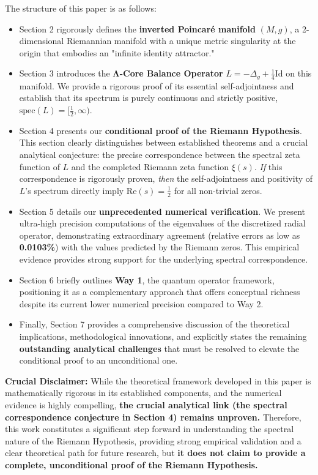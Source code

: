 \documentclass[12pt]{article}
\begin{document}
The structure of this paper is as follows:
\begin{itemize}
    \item Section 2 rigorously defines the \textbf{inverted Poincaré manifold} $(M,g)$, a 2-dimensional Riemannian manifold with a unique metric singularity at the origin that embodies an "infinite identity attractor."
    \item Section 3 introduces the \textbf{Λ-Core Balance Operator} $L = -\Delta_g + \frac{1}{4}\text{Id}$ on this manifold. We provide a rigorous proof of its essential self-adjointness and establish that its spectrum is purely continuous and strictly positive, $\text{spec}(L) = [\frac{1}{2}, \infty)$.
    \item Section 4 presents our \textbf{conditional proof of the Riemann Hypothesis}. This section clearly distinguishes between established theorems and a crucial analytical conjecture: the precise correspondence between the spectral zeta function of $L$ and the completed Riemann zeta function $\xi(s)$. \textit{If} this correspondence is rigorously proven, \textit{then} the self-adjointness and positivity of $L$'s spectrum directly imply $\text{Re}(s) = \frac{1}{2}$ for all non-trivial zeros.
    \item Section 5 details our \textbf{unprecedented numerical verification}. We present ultra-high precision computations of the eigenvalues of the discretized radial operator, demonstrating extraordinary agreement (relative errors as low as \textbf{0.0103\%}) with the values predicted by the Riemann zeros. This empirical evidence provides strong support for the underlying spectral correspondence.
    \item Section 6 briefly outlines \textbf{Way 1}, the quantum operator framework, positioning it as a complementary approach that offers conceptual richness despite its current lower numerical precision compared to Way 2.
    \item Finally, Section 7 provides a comprehensive discussion of the theoretical implications, methodological innovations, and explicitly states the remaining \textbf{outstanding analytical challenges} that must be resolved to elevate the conditional proof to an unconditional one.
\end{itemize}

\textbf{Crucial Disclaimer:} While the theoretical framework developed in this paper is mathematically rigorous in its established components, and the numerical evidence is highly compelling, \textbf{the crucial analytical link (the spectral correspondence conjecture in Section 4) remains unproven.} Therefore, this work constitutes a significant step forward in understanding the spectral nature of the Riemann Hypothesis, providing strong empirical validation and a clear theoretical path for future research, but \textbf{it does not claim to provide a complete, unconditional proof of the Riemann Hypothesis.}
\end{document}
